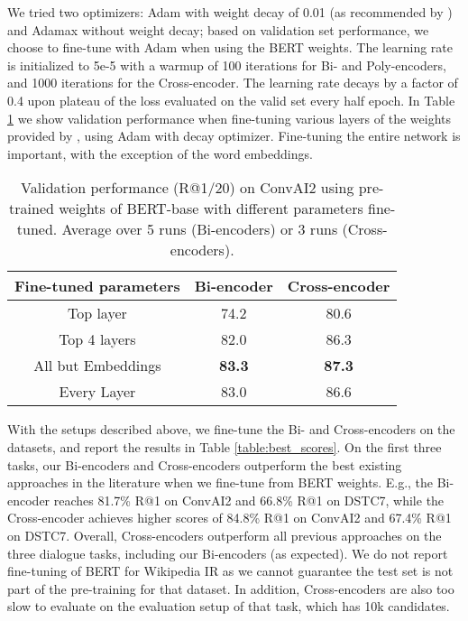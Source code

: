 \documentclass{article} \usepackage{iclr2020_conference,times}
\begin{document}
We tried two optimizers: Adam \citep{kingma2014adam} with weight decay of 0.01 (as recommended by \citep{devlin-etal-2019-bert}) and Adamax  \citep{kingma2014adam} without weight decay; based on validation set performance, we choose to fine-tune with Adam when using the BERT weights.
The learning rate is initialized to 5e-5 with a warmup of 100 iterations for Bi- and Poly-encoders, and 1000 iterations for the Cross-encoder. The learning rate decays by a factor of 0.4 upon plateau of the loss evaluated on the valid set every half epoch. In Table \ref{table:frozen_params} we show validation performance when fine-tuning various layers of the weights provided by \citep{devlin-etal-2019-bert}, using Adam with decay optimizer.  Fine-tuning the entire network is important, with the exception of the word embeddings.
\begin{table}[h]
\center
\setlength\tabcolsep{3.2pt} 
\begin{tabular}{|c|c|c|}
\hline
Fine-tuned parameters & Bi-encoder & Cross-encoder \\
\hline

Top layer                  & 74.2 & 80.6 \\
Top 4 layers            & 82.0 & 86.3 \\
All but Embeddings  & \textbf{83.3} & \textbf{87.3}  \\
Every Layer & 83.0 & 86.6 \\

\hline
\end{tabular}
\caption{Validation performance (R@1/20) on ConvAI2 using pre-trained weights of  BERT-base with different  parameters fine-tuned. Average over 5 runs (Bi-encoders) or 3 runs (Cross-encoders).}
\label{table:frozen_params}
\vspace{-1.0em}
\end{table}


With the setups described above, we fine-tune the Bi- and Cross-encoders on the datasets,
and report the results in Table \ref{table:best_scores}. On the first three tasks, our Bi-encoders and Cross-encoders outperform the best existing approaches in the literature when we fine-tune from BERT weights. E.g., the Bi-encoder reaches 81.7\% R@1 on ConvAI2 and 66.8\% R@1 on DSTC7, while the Cross-encoder achieves higher scores of 84.8\% R@1 on ConvAI2 and 67.4\% R@1 on DSTC7.
Overall, Cross-encoders outperform all previous approaches on the three dialogue tasks, including our Bi-encoders (as expected). We do not report fine-tuning of BERT for Wikipedia IR as we cannot guarantee the test
set is not part of the pre-training for that dataset. In addition, Cross-encoders are also too slow to evaluate on the evaluation setup of that task, which has 10k candidates.
\end{document}
